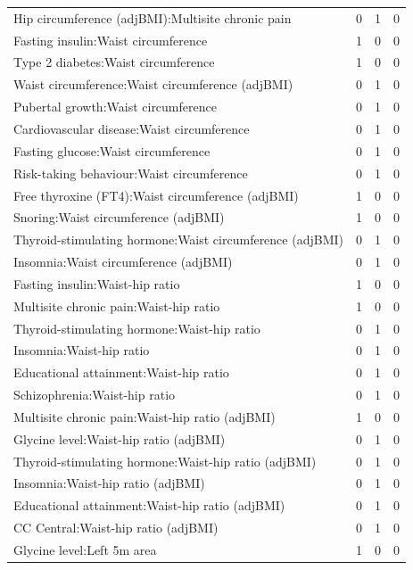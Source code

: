 \begin{table}[ht]
\begin{tabular}{lrrr}
  Hip circumference (adjBMI):Multisite chronic pain &   0 &   1 &   0 \\ 
  Fasting insulin:Waist circumference &   1 &   0 &   0 \\ 
  Type 2 diabetes:Waist circumference &   1 &   0 &   0 \\ 
  Waist circumference:Waist circumference (adjBMI) &   0 &   1 &   0 \\ 
  Pubertal growth:Waist circumference &   0 &   1 &   0 \\ 
  Cardiovascular disease:Waist circumference &   0 &   1 &   0 \\ 
  Fasting glucose:Waist circumference &   0 &   1 &   0 \\ 
  Risk-taking behaviour:Waist circumference &   0 &   1 &   0 \\ 
  Free thyroxine (FT4):Waist circumference (adjBMI) &   1 &   0 &   0 \\ 
  Snoring:Waist circumference (adjBMI) &   1 &   0 &   0 \\ 
  Thyroid-stimulating hormone:Waist circumference (adjBMI) &   0 &   1 &   0 \\ 
  Insomnia:Waist circumference (adjBMI) &   0 &   1 &   0 \\ 
  Fasting insulin:Waist-hip ratio &   1 &   0 &   0 \\ 
  Multisite chronic pain:Waist-hip ratio &   1 &   0 &   0 \\ 
  Thyroid-stimulating hormone:Waist-hip ratio &   0 &   1 &   0 \\ 
  Insomnia:Waist-hip ratio &   0 &   1 &   0 \\ 
  Educational attainment:Waist-hip ratio &   0 &   1 &   0 \\ 
  Schizophrenia:Waist-hip ratio &   0 &   1 &   0 \\ 
  Multisite chronic pain:Waist-hip ratio (adjBMI) &   1 &   0 &   0 \\ 
  Glycine level:Waist-hip ratio (adjBMI) &   0 &   1 &   0 \\ 
  Thyroid-stimulating hormone:Waist-hip ratio (adjBMI) &   0 &   1 &   0 \\ 
  Insomnia:Waist-hip ratio (adjBMI) &   0 &   1 &   0 \\ 
  Educational attainment:Waist-hip ratio (adjBMI) &   0 &   1 &   0 \\ 
  CC Central:Waist-hip ratio (adjBMI) &   0 &   1 &   0 \\ 
  Glycine level:Left 5m area &   1 &   0 &   0 \\ 

\end{tabular}
\end{table}
